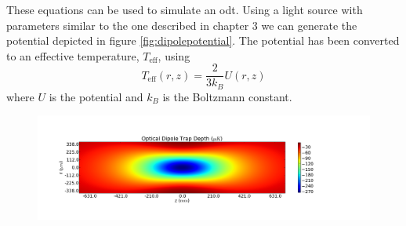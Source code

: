 These equations can be used to simulate an \gls{odt}. Using a light source with parameters similar to the one described in chapter 3 we can generate the potential depicted in figure \ref{fig:dipolepotential}. The potential has been converted to an effective temperature, $T_{\mathrm{eff}}$, using
\begin{equation}
T_{\mathrm{eff}}(r, z) = \frac{2}{3 k_B} U(r, z)
\end{equation}
where $U$ is the potential and $k_B$ is the Boltzmann constant.

\begin{figure}[H]
\centering
\includegraphics[width=\textwidth]{figs/2dtrapdepth.pdf}


\end{figure}
